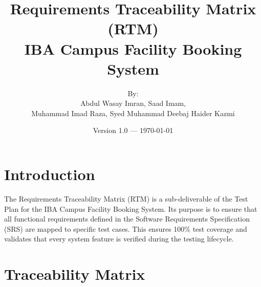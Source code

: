 \documentclass[11pt,a4paper]{article}
\title{\textbf{Requirements Traceability Matrix (RTM)}\\ \large IBA Campus Facility Booking System}
\author{By: \\ Abdul Wasay Imran, Saad Imam, \\ Muhammad Imad Raza, Syed Muhammad Deebaj Haider Kazmi}
\date{Version 1.0 --- \today}
\begin{document}
\maketitle

\section{Introduction}
The Requirements Traceability Matrix (RTM) is a sub-deliverable of the Test Plan for the IBA Campus Facility Booking System. Its purpose is to ensure that all functional requirements defined in the Software Requirements Specification (SRS) are mapped to specific test cases. This ensures 100\% test coverage and validates that every system feature is verified during the testing lifecycle.

\section{Traceability Matrix}
\end{document}
